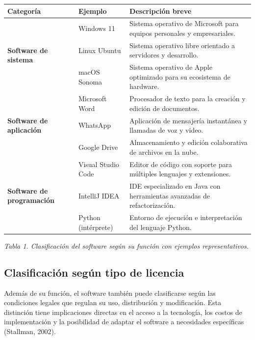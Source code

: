 \documentclass[12pt,a4paper]{article}
\begin{document}
	\begin{center}
		\singlespacing
		\begin{tabular}{|p{3.2cm}|p{3.8cm}|p{6.2cm}|}
			\hline
			\textbf{Categoría} & \textbf{Ejemplo} & \textbf{Descripción breve} \\ \hline
			\multirow{3}{3.2cm}{\textbf{Software de sistema}} & Windows 11 & Sistema operativo de Microsoft para equipos personales y empresariales. \\ \cline{2-3}
			& Linux Ubuntu & Sistema operativo libre orientado a servidores y desarrollo. \\ \cline{2-3}
			& macOS Sonoma & Sistema operativo de Apple optimizado para su ecosistema de hardware. \\ \hline
			\multirow{3}{3.2cm}{\textbf{Software de aplicación}} & Microsoft Word & Procesador de texto para la creación y edición de documentos. \\ \cline{2-3}
			& WhatsApp & Aplicación de mensajería instantánea y llamadas de voz y video. \\ \cline{2-3}
			& Google Drive & Almacenamiento y edición colaborativa de archivos en la nube. \\ \hline
			\multirow{3}{3.2cm}{\textbf{Software de programación}} & Visual Studio Code & Editor de código con soporte para múltiples lenguajes y extensiones. \\ \cline{2-3}
			& IntelliJ IDEA & IDE especializado en Java con herramientas avanzadas de refactorización. \\ \cline{2-3}
			& Python (intérprete) & Entorno de ejecución e interpretación del lenguaje Python. \\ \hline
		\end{tabular}
		
		\vspace{0.3cm}
		\textit{Tabla 1. Clasificación del software según su función con ejemplos representativos.}
	\end{center}
	
	\doublespacing
	
	\subsection{Clasificación según tipo de licencia}
	
	Además de su función, el software también puede clasificarse según las condiciones legales que regulan su uso, distribución y modificación. Esta distinción tiene implicaciones directas en el acceso a la tecnología, los costos de implementación y la posibilidad de adaptar el software a necesidades específicas (Stallman, 2002).
	
\end{document}
